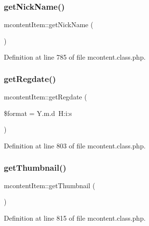 \subsubsection{\texorpdfstring{get\+Nick\+Name()}{getNickName()}}
{\footnotesize\ttfamily mcontent\+Item\+::get\+Nick\+Name (\begin{DoxyParamCaption}{ }\end{DoxyParamCaption})}



Definition at line 785 of file mcontent.\+class.\+php.

\hypertarget{classmcontentItem_a0b13a7bf2aff3c032a929559eaf6ddd6}{}\label{classmcontentItem_a0b13a7bf2aff3c032a929559eaf6ddd6} 
\subsubsection{\texorpdfstring{get\+Regdate()}{getRegdate()}}
{\footnotesize\ttfamily mcontent\+Item\+::get\+Regdate (\begin{DoxyParamCaption}\item[{}]{\$format = {\ttfamily \textquotesingle{}Y.m.d~H\+:i\+:s\textquotesingle{}} }\end{DoxyParamCaption})}



Definition at line 803 of file mcontent.\+class.\+php.

\hypertarget{classmcontentItem_a25e5c63dceabc33afe0b5ce5b3ddafcf}{}\label{classmcontentItem_a25e5c63dceabc33afe0b5ce5b3ddafcf} 
\subsubsection{\texorpdfstring{get\+Thumbnail()}{getThumbnail()}}
{\footnotesize\ttfamily mcontent\+Item\+::get\+Thumbnail (\begin{DoxyParamCaption}{ }\end{DoxyParamCaption})}



Definition at line 815 of file mcontent.\+class.\+php.

\hypertarget{classmcontentItem_a180633138fb77537e7da900074aa7454}{}\label{classmcontentItem_a180633138fb77537e7da900074aa7454} 

